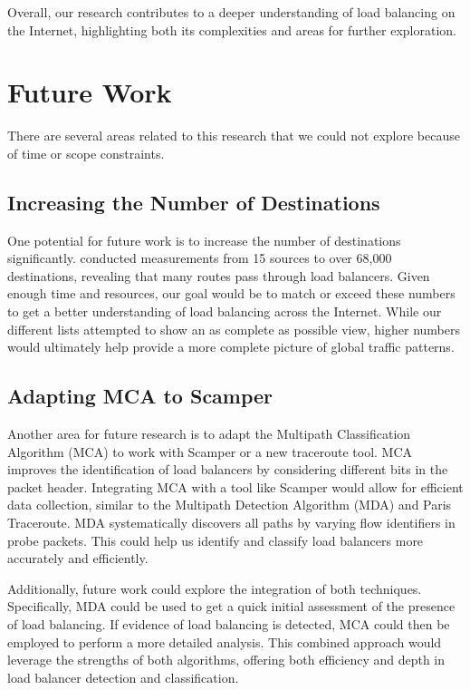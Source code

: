 \documentclass[12pt]{cwru_thesis}
\begin{document}
Overall, our research contributes to a deeper understanding of load balancing on the Internet, highlighting both its complexities and areas for further exploration.

\chapter{Future Work}

There are several areas related to this research that we could not explore because of time or scope constraints. 

\section*{Increasing the Number of Destinations}

One potential for future work is to increase the number of destinations significantly. \textbf{\cite{augustin2010measuring} }conducted measurements from 15 sources to over 68,000 destinations, revealing that many routes pass through load balancers. Given enough time and resources, our goal would be to match or exceed these numbers to get a better understanding of load balancing across the Internet. While our different lists attempted to show an as complete as possible view, higher numbers would ultimately help provide a more complete picture of global traffic patterns.

\section*{Adapting MCA to Scamper}

Another area for future research is to adapt the Multipath Classification Algorithm (MCA) to work with Scamper or a new traceroute tool. MCA improves the identification of load balancers by considering different bits in the packet header. Integrating MCA with a tool like Scamper would allow for efficient data collection, similar to the Multipath Detection Algorithm (MDA) and Paris Traceroute. MDA systematically discovers all paths by varying flow identifiers in probe packets. This could help us identify and classify load balancers more accurately and efficiently. 

Additionally, future work could explore the integration of both techniques. Specifically, MDA could be used to get a quick initial assessment of the presence of load balancing. If evidence of load balancing is detected, MCA could then be employed to perform a more detailed analysis. This combined approach would leverage the strengths of both algorithms, offering both efficiency and depth in load balancer detection and classification.
\end{document}
